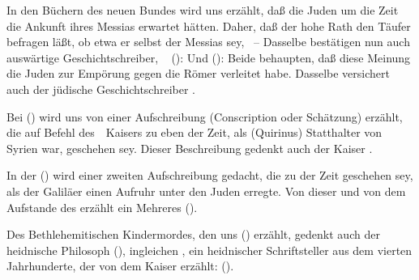 \begin{aufza}
\item {}
\begin{aufzb}
\item In den Büchern des neuen Bundes wird uns erzählt, daß die Juden um die Zeit  die Ankunft ihres Messias erwartet hätten. Daher, daß der hohe Rath  den Täufer befragen läßt, ob etwa er selbst der Messias sey, \udgl\  -- Dasselbe bestätigen nun auch auswärtige Geschichtschreiber, \zB\  ():  Und  ():  Beide behaupten, daß diese Meinung die Juden zur Empörung gegen die Römer verleitet habe. Dasselbe versichert auch der jüdische Geschichtschreiber .
\item Bei  () wird uns von einer Aufschreibung (Conscription oder Schätzung) erzählt, die auf Befehl des~\ Kaisers  zu eben der Zeit, als  (Quirinus) Statthalter von Syrien war, geschehen sey. Dieser Beschreibung gedenkt auch der Kaiser .
\item In der  () wird einer zweiten Aufschreibung gedacht, die zu der Zeit geschehen sey, als  der Galiläer einen Aufruhr unter den Juden erregte. Von dieser und von dem Aufstande des  erzählt ein Mehreres  ().
\item Des Bethlehemitischen Kindermordes, den uns  () erzählt, gedenkt auch der heidnische Philosoph  (), ingleichen , ein heidnischer Schriftsteller aus dem vierten Jahrhunderte, der von dem Kaiser  erzählt:  ().

\end{aufzb}
\end{aufza}
